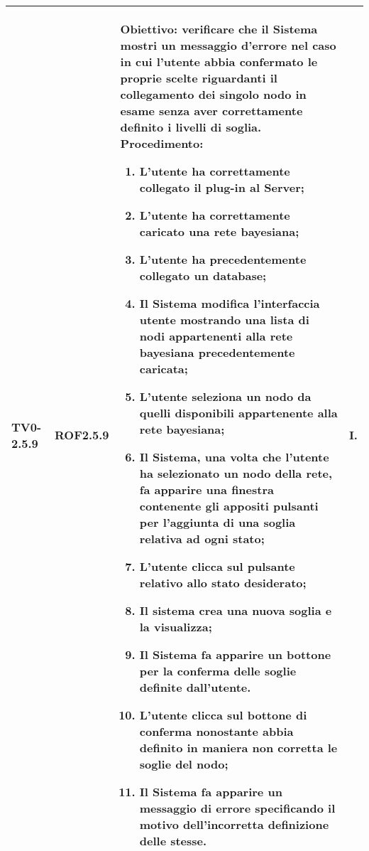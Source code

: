 \begin{longtable}{|C{.15\textwidth}|C{.13\textwidth}|m{.52\textwidth}|C{.08\textwidth}|}
TV0-2.5.9 & ROF2.5.9 &
	\textbf{Obiettivo}: verificare che il Sistema mostri un messaggio d'errore nel caso in cui l'utente abbia confermato le proprie scelte riguardanti il collegamento dei singolo nodo in esame senza aver correttamente definito i livelli di soglia. \newline
	\textbf{Procedimento}:
	\begin{enumerate}
		\item L'utente ha correttamente collegato il plug-in al Server;
		\item L'utente ha correttamente caricato una rete bayesiana;
		\item L'utente ha precedentemente collegato un database;
		\item Il Sistema modifica l'interfaccia utente mostrando una lista di nodi appartenenti alla rete bayesiana precedentemente caricata;
		\item L'utente seleziona un nodo da quelli disponibili appartenente alla rete bayesiana;
		\item Il Sistema, una volta che l'utente ha selezionato un nodo della rete, fa apparire una finestra contenente gli appositi pulsanti per l'aggiunta di una soglia relativa ad ogni stato;
		\item L'utente clicca sul pulsante relativo allo stato desiderato;
		\item Il sistema crea una nuova soglia e la visualizza;
		\item Il Sistema fa apparire un bottone per la conferma delle soglie definite dall'utente.
		\item L'utente clicca sul bottone di conferma nonostante abbia definito in maniera non corretta le soglie del nodo;
		\item Il Sistema fa apparire un messaggio di errore specificando il motivo dell'incorretta definizione delle stesse.
	\end{enumerate}
	& I. \\
\hline


\end{longtable}
